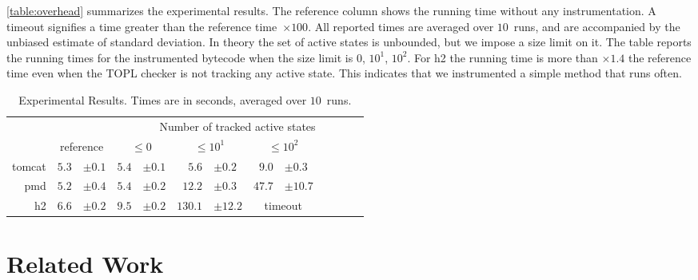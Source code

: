 \documentclass[9pt, preprint]{sigplanconf} %
\theoremstyle{definition}
\theoremstyle{remark}
\begin{document}
\bigskip
\autoref{table:overhead} summarizes the experimental results.
The reference column shows the running time without any instrumentation.
A timeout signifies a time greater than the reference time~$\times100$.
All reported times are averaged over $10$~runs, and are accompanied by the unbiased estimate of standard deviation.
In theory the set of active states is unbounded, but we impose a size limit on it.
The table reports the running times for the instrumented bytecode when the size limit is $0$, $10^1$, $10^2$.
For h2 the running time is more than $\times1.4$ the reference time even when the TOPL checker is not tracking any active state.
This indicates that we instrumented a simple method that runs often.

\begin{table}[t]\centering
\begin{tabular}{@{}rr@{}lr@{}lr@{}lr@{}lr@{}lr@{}l}
  &&
  & \multicolumn{10}{c}{Number of tracked active states} \\ \cmidrule{4-13}
& \multicolumn{2}{c}{reference}
  &\multicolumn{2}{c}{$\le0$}
  &\multicolumn{2}{c}{$\le10^1$}
  &\multicolumn{2}{c}{$\le10^2$}
\\ \midrule
tomcat
  & $5.3$ & $\pm0.1$
  & $5.4$ & $\pm0.1$
  & $5.6$ & $\pm0.2$
  & $9.0$ & $\pm0.3$
\\
pmd
  & $5.2$ & $\pm0.4$
  & $5.4$ & $\pm0.2$
  & $12.2$ & $\pm0.3$
  & $47.7$ & $\pm10.7$
  \\
h2
  & $6.6$ & $\pm0.2$
  & $9.5$ & $\pm0.2$
  & $130.1$ & $\pm12.2$
  & \multicolumn{2}{c}{timeout}
  \\
\end{tabular}
\caption{
  Experimental Results.
  Times are in seconds, averaged over $10$~runs.
}\label{table:overhead}
\end{table}

\section{Related Work}\label{sec:related} %

\end{document}
